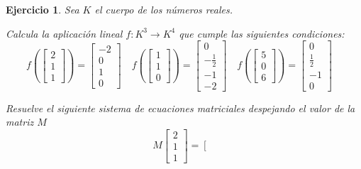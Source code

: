 \documentclass[12pt]{amsart}
\newtheorem{ejer}{Ejercicio}
\begin{document}
\begin{ejer} Sea $K$ el cuerpo de los n\'umeros reales.
\newline
\noindent\begin{minipage}{\textwidth}
\begin{tcolorbox}[colback = green!20!white,title=Versión Aplicación]
Calcula la aplicaci\'on lineal $f:K^{3} \to K^{4}$ que cumple las siguientes condiciones: 
\[f\left(\left[\begin{array}{r}
2 \\
1 \\
1
\end{array}\right]\right) = \left[\begin{array}{r}
-2 \\
0 \\
1 \\
0
\end{array}\right] \quad f\left(\left[\begin{array}{r}
1 \\
1 \\
0
\end{array}\right]\right) = \left[\begin{array}{r}
0 \\
-\frac{1}{2} \\
-1 \\
-2
\end{array}\right] \quad f\left(\left[\begin{array}{r}
5 \\
0 \\
6
\end{array}\right]\right) = \left[\begin{array}{r}
0 \\
\frac{1}{2} \\
-1 \\
0
\end{array}\right] \quad 
\]\end{tcolorbox}
\end{minipage} \newline
\noindent\begin{minipage}{\textwidth}
\begin{tcolorbox}[colback = blue!20!white,title=Versión Sistema Matricial]
Resuelve el siguiente sistema de ecuaciones matriciales despejando el valor de la matriz $M$
\[M \left[\begin{array}{r}
2 \\
1 \\
1
\end{array}\right] = \left[\begin{array}{r}

\end{array}\]
\end{tcolorbox}
\end{minipage}
\end{ejer}
\end{document}
